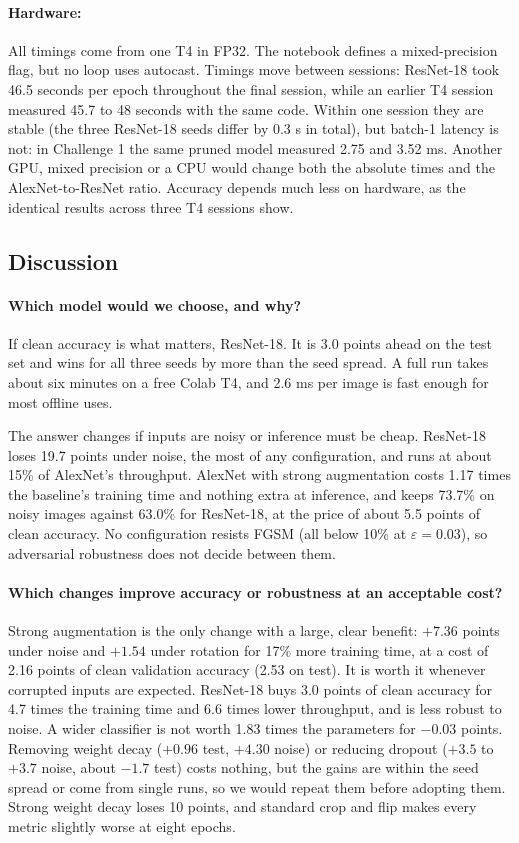 \documentclass[11pt,a4paper]{article}
\begin{document}
\paragraph{Hardware:} All timings come from one T4 in FP32. The notebook defines a mixed-precision flag, but no loop uses autocast. Timings move between sessions: ResNet-18 took 46.5 seconds per epoch throughout the final session, while an earlier T4 session measured 45.7 to 48 seconds with the same code. Within one session they are stable (the three ResNet-18 seeds differ by 0.3 s in total), but batch-1 latency is not: in Challenge 1 the same pruned model measured 2.75 and 3.52 ms. Another GPU, mixed precision or a CPU would change both the absolute times and the AlexNet-to-ResNet ratio. Accuracy depends much less on hardware, as the identical results across three T4 sessions show.

\subsection{Discussion}

\paragraph{Which model would we choose, and why?}
If clean accuracy is what matters, ResNet-18. It is 3.0 points ahead on the test set and wins for all three seeds by more than the seed spread. A full run takes about six minutes on a free Colab T4, and 2.6 ms per image is fast enough for most offline uses.

The answer changes if inputs are noisy or inference must be cheap. ResNet-18 loses 19.7 points under noise, the most of any configuration, and runs at about 15\% of AlexNet's throughput. AlexNet with strong augmentation costs 1.17 times the baseline's training time and nothing extra at inference, and keeps 73.7\% on noisy images against 63.0\% for ResNet-18, at the price of about 5.5 points of clean accuracy. No configuration resists FGSM (all below 10\% at $\varepsilon=0.03$), so adversarial robustness does not decide between them.

\paragraph{Which changes improve accuracy or robustness at an acceptable cost?}
Strong augmentation is the only change with a large, clear benefit: $+7.36$ points under noise and $+1.54$ under rotation for 17\% more training time, at a cost of 2.16 points of clean validation accuracy (2.53 on test). It is worth it whenever corrupted inputs are expected. ResNet-18 buys 3.0 points of clean accuracy for 4.7 times the training time and 6.6 times lower throughput, and is less robust to noise. A wider classifier is not worth 1.83 times the parameters for $-0.03$ points. Removing weight decay ($+0.96$ test, $+4.30$ noise) or reducing dropout ($+3.5$ to $+3.7$ noise, about $-1.7$ test) costs nothing, but the gains are within the seed spread or come from single runs, so we would repeat them before adopting them. Strong weight decay loses 10 points, and standard crop and flip makes every metric slightly worse at eight epochs.
\end{document}
